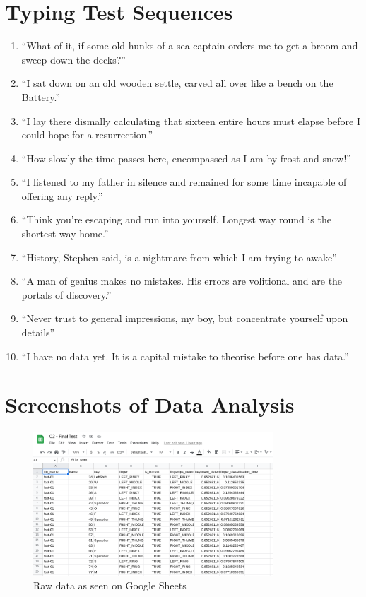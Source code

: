 \documentclass{report}
\begin{document}
\chapter{Typing Test Sequences}
\label{appendix:test-sequences}
\normalsize
\begin{enumerate}
	\item ``What of it, if some old hunks of a sea-captain orders me to get a broom and sweep down the decks?'' \parencite{moby-dick}
	\item ``I sat down on an old wooden settle, carved all over like a bench on the Battery.'' \parencite{moby-dick}
	\item ``I lay there dismally calculating that sixteen entire hours must elapse before I could hope for a resurrection.'' \parencite{moby-dick}
	\item ``How slowly the time passes here, encompassed as I am by frost and snow!'' \parencite{frankenstein}
	\item ``I listened to my father in silence and remained for some time incapable of offering any reply.'' \parencite{frankenstein}
	\item ``Think you’re escaping and run into yourself. Longest way round is the shortest way home.'' \parencite{ulysses}
	\item ``History, Stephen said, is a nightmare from which I am trying to awake'' \parencite{ulysses}
	\item ``A man of genius makes no mistakes. His errors are volitional and are the portals of discovery.'' \parencite{ulysses}
	\item ``Never trust to general impressions, my boy, but concentrate yourself upon details'' \parencite{sherlock}
	\item ``I have no data yet. It is a capital mistake to theorise before one has data.'' \parencite{sherlock}
\end{enumerate}

\chapter{Screenshots of Data Analysis}
\label{appendix:sheets}

\begin{figure}[H]
	\centering
	\includegraphics[width=0.8\textwidth]{sheets-raw-data.png}
	\caption{Raw data as seen on Google Sheets}
\end{figure}
\end{document}
